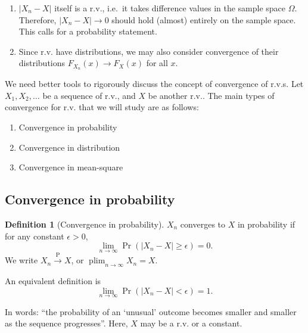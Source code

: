 \documentclass[
]{book}
\providecommand{\tightlist}{%
  \setlength{\itemsep}{0pt}\setlength{\parskip}{0pt}}
\DeclareMathOperator*{\plim}{plim}
\theoremstyle{definition}
\newtheorem{definition}{Definition}[chapter]
\theoremstyle{definition}
\theoremstyle{definition}
\theoremstyle{definition}
\theoremstyle{remark}
\begin{document}
\begin{enumerate}
\def\labelenumi{\arabic{enumi}.}
\item
  \(|X_n-X|\) itself is a r.v., i.e.~it takes difference values in the
  sample space \(\Omega\). Therefore, \(|X_n - X|\to 0\) should hold
  (almost) entirely on the sample space. This calls for a probability
  statement.
\item
  Since r.v. have distributions, we may also consider convergence of
  their distributions \(F_{X_n}(x)\to F_X(x)\) for all \(x\).
\end{enumerate}

We need better tools to rigorously discuss the concept of convergence of r.v.s.
Let \(X_1,X_2,\dots\) be a sequence of r.v., and \(X\)
be another r.v.. The main types of convergence for r.v. that we will study are as follows:

\begin{enumerate}
\def\labelenumi{\arabic{enumi}.}
\tightlist
\item
  Convergence in probability
\item
  Convergence in distribution
\item
  Convergence in mean-square
\end{enumerate}

\hypertarget{convergence-in-probability}{%
\subsection{Convergence in probability}\label{convergence-in-probability}}

\begin{definition}[Convergence in probability]
\(X_n\) converges to \(X\) in probability if for any constant \(\epsilon>0\),
\[\lim_{n\to\infty} \Pr(|X_n-X|\geq\epsilon) = 0.\]
We write
\(X_n\xrightarrow{\text{P}}X\), or \(\plim_{n\to\infty}X_n = X\).
\end{definition}

An equivalent definition is
\[
  \lim_{n\to\infty}\Pr(|X_n-X| < \epsilon)  = 1.
\]

In words: ``the probability of an `unusual' outcome becomes smaller and smaller as the sequence progresses''.
Here, \(X\) may be a r.v. or a constant.
\end{document}
